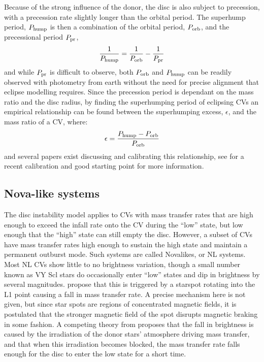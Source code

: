 Because of the strong influence of the donor, the disc is also subject to precession, with a precession rate slightly longer than the orbital period. The superhump period, $P_{\rm hump}$ is then a combination of the orbital period, $P_{\rm orb}$, and the precessional period $P_{\rm pr}$,
\begin{equation}
    \frac{1}{P_{\rm hump}} = \frac{1}{P_{\rm orb}} - \frac{1}{P_{\rm pr}}
\end{equation}
and while $P_{\rm pr}$ is difficult to observe, both $P_{\rm orb}$ and $P_{\rm hump}$ can be readily observed with photometry from earth without the need for precise alignment that eclipse modelling requires. Since the precession period is dependant on the mass ratio and the disc radius, by finding the superhumping period of eclipsing CVs an empirical relationship can be found between the superhumping excess, $\epsilon$, and the mass ratio of a CV, where:
\begin{equation}
    \epsilon = \frac{P_{\rm hump} - P_{\rm orb}}{P_{\rm orb}}
\end{equation}
and several papers exist discussing and calibrating this relationship, see \citet{McAllister2019} for a recent calibration and good starting point for more information.


\subsection{Nova-like systems}

The disc instability model applies to CVs with mass transfer rates that are high enough to exceed the infall rate onto the CV during the ``low'' state, but low enough that the ``high'' state can still empty the disc. However, a subset of CVs have mass transfer rates high enough to sustain the high state and maintain a permanent outburst mode. Such systems are called Novalikes, or NL systems. Most NL CVs show little to no brightness variation, though a small number known as VY Scl stars do occasionally enter ``low'' states and dip in brightness by several magnitudes. \citet{livio1994} propose that this is triggered by a starspot rotating into the L1 point causing a fall in mass transfer rate. A precise mechanism here is not given, but since star spots are regions of concentrated magnetic fields, it is postulated that the stronger magnetic field of the spot disrupts magnetic braking in some fashion. A competing theory from \citet{wu1995} proposes that the fall in brightness is caused by the irradiation of the donor stars' atmosphere driving mass transfer, and that when this irradiation becomes blocked, the mass transfer rate falls enough for the disc to enter the low state for a short time.


